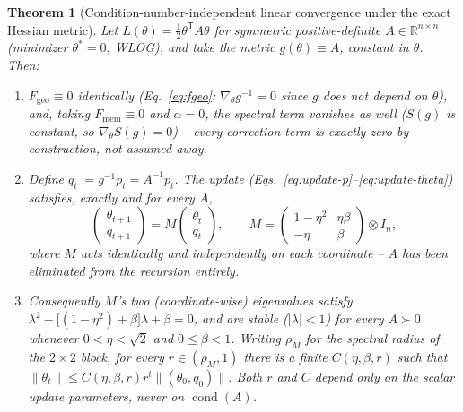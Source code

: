 \documentclass[10pt,twocolumn]{article}
\newtheorem{theorem}{Theorem}
\begin{document}
\begin{theorem}[Condition-number-independent linear convergence under the exact Hessian metric]
\label{thm:conditioning}
Let $L(\theta) = \tfrac12\theta^{\mathsf T} A \theta$ for symmetric
positive-definite $A\in\mathbb{R}^{n\times n}$ (minimizer $\theta^\ast=0$,
WLOG), and take the metric $g(\theta) \equiv A$, constant in $\theta$. Then:
\begin{enumerate}[label=(\alph*)]
\item $F_{\mathrm{geo}} \equiv 0$ identically (Eq.~\eqref{eq:fgeo}: $\nabla_\theta g^{-1}=0$
  since $g$ does not depend on $\theta$), and, taking $F_{\mathrm{mem}}\equiv0$
  and $\alpha=0$, the spectral term vanishes as well ($S(g)$ is constant, so
  $\nabla_\theta S(g)=0$) -- every correction term is exactly zero by
  construction, not assumed away.
\item Define $q_t := g^{-1}p_t = A^{-1}p_t$. The update
  (Eqs.~\eqref{eq:update-p}--\eqref{eq:update-theta}) satisfies, exactly and
  for every $A$,
  \begin{equation}
  \begin{pmatrix}\theta_{t+1}\\ q_{t+1}\end{pmatrix}
  = M \begin{pmatrix}\theta_t\\ q_t\end{pmatrix}, \qquad
  M = \begin{pmatrix} 1-\eta^2 & \eta\beta \\ -\eta & \beta \end{pmatrix}
  \otimes I_n,
  \label{eq:theorem-recursion}
  \end{equation}
  where $M$ acts identically and independently on each coordinate --
  $A$ has been eliminated from the recursion entirely.
\item Consequently $M$'s two (coordinate-wise) eigenvalues satisfy
  $\lambda^2 - \big[(1-\eta^2)+\beta\big]\lambda + \beta = 0$, and are stable
  ($|\lambda|<1$) for every $A\succ0$ whenever $0<\eta<\sqrt2$ and
  $0\le\beta<1$. Writing $\rho_M$ for the spectral radius of the
  $2\times2$ block, for every $r\in(\rho_M,1)$ there is a finite
  $C(\eta,\beta,r)$ such that
  $\|\theta_t\|\le C(\eta,\beta,r)r^t\|(\theta_0,q_0)\|$. Both $r$ and
  $C$ depend only on the scalar update parameters, \emph{never on
  $\operatorname{cond}(A)$}.
\end{enumerate}
\end{theorem}
\end{document}

